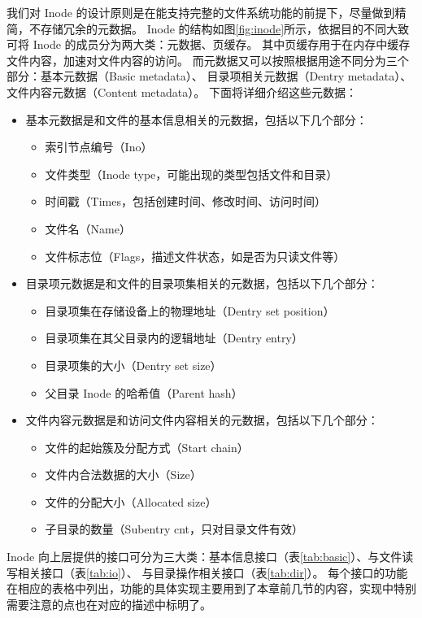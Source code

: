 我们对 Inode 的设计原则是在能支持完整的文件系统功能的前提下，尽量做到精简，不存储冗余的元数据。
Inode 的结构如图\ref{fig:inode}所示，依据目的不同大致可将 Inode 的成员分为两大类：元数据、页缓存。
其中页缓存用于在内存中缓存文件内容，加速对文件内容的访问。
而元数据又可以按照根据用途不同分为三个部分：基本元数据（Basic metadata）、
目录项相关元数据（Dentry metadata）、文件内容元数据（Content metadata）。
下面将详细介绍这些元数据：
\begin{itemize}
    \item 基本元数据是和文件的基本信息相关的元数据，包括以下几个部分：
    \begin{itemize} 
        \item 索引节点编号（Ino）
        \item 文件类型（Inode type，可能出现的类型包括文件和目录）
        \item 时间戳（Times，包括创建时间、修改时间、访问时间）
        \item 文件名（Name）
        \item 文件标志位（Flags，描述文件状态，如是否为只读文件等）
    \end{itemize}
    \item 目录项元数据是和文件的目录项集相关的元数据，包括以下几个部分：
    \begin{itemize} 
        \item 目录项集在存储设备上的物理地址（Dentry set position）
        \item 目录项集在其父目录内的逻辑地址（Dentry entry）
        \item 目录项集的大小（Dentry set size）
        \item 父目录 Inode 的哈希值（Parent hash）
    \end{itemize}
    \item 文件内容元数据是和访问文件内容相关的元数据，包括以下几个部分：
    \begin{itemize} 
        \item 文件的起始簇及分配方式（Start chain）
        \item 文件内合法数据的大小（Size）
        \item 文件的分配大小（Allocated size）
        \item 子目录的数量（Subentry cnt，只对目录文件有效）
    \end{itemize}
\end{itemize}

Inode 向上层提供的接口可分为三大类：基本信息接口（表\ref{tab:basic}）、与文件读写相关接口（表\ref{tab:io}）、
与目录操作相关接口（表\ref{tab:dir}）。
每个接口的功能在相应的表格中列出，功能的具体实现主要用到了本章前几节的内容，实现中特别需要注意的点也在对应的描述中标明了。

